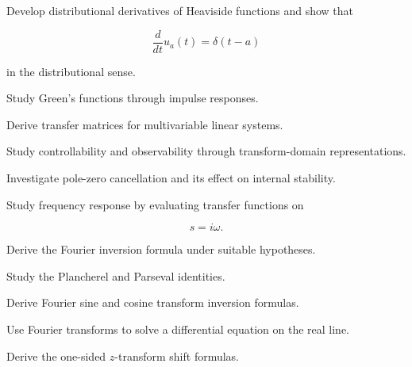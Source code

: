 \begin{exercise}[4]
Develop distributional derivatives of Heaviside functions and show that

\[
\frac{d}{dt}u_a(t)
=
\delta(t-a)
\]

in the distributional sense.
\end{exercise}

\begin{exercise}[4]
Study Green's functions through impulse responses.
\end{exercise}

\begin{exercise}[4]
Derive transfer matrices for multivariable linear systems.
\end{exercise}

\begin{exercise}[4]
Study controllability and observability through transform-domain
representations.
\end{exercise}

\begin{exercise}[4]
Investigate pole-zero cancellation and its effect on internal stability.
\end{exercise}

\begin{exercise}[4]
Study frequency response by evaluating transfer functions on

\[
s=i\omega.
\]
\end{exercise}

\begin{exercise}[4]
Derive the Fourier inversion formula under suitable hypotheses.
\end{exercise}

\begin{exercise}[4]
Study the Plancherel and Parseval identities.
\end{exercise}

\begin{exercise}[4]
Derive Fourier sine and cosine transform inversion formulas.
\end{exercise}

\begin{exercise}[4]
Use Fourier transforms to solve a differential equation on the real line.
\end{exercise}

\begin{exercise}[4]
Derive the one-sided \(z\)-transform shift formulas.
\end{exercise}

